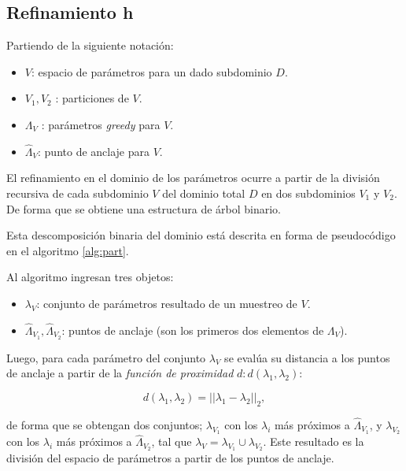 \subsection{Refinamiento h}

Partiendo de la siguiente notación:
\begin{itemize}
\item $V$: espacio de parámetros para un dado subdominio $D$.
\item $V_1, V_2$ : particiones de $V$.
\item $\Lambda_V$ : parámetros \textit{greedy} para $V$.
\item  $\hat{\Lambda}_{V}$: punto de anclaje para $V$.
\end{itemize}

El refinamiento en el dominio de los parámetros ocurre a partir de la división recursiva de cada subdominio $V$ del dominio total $D$ en dos subdominios $V_1$ y $V_2$. De forma que se obtiene una estructura de árbol binario.


Esta descomposición binaria del dominio está descrita en forma de pseudocódigo en el algoritmo \ref{alg:part}.

Al algoritmo ingresan tres objetos:

\begin{itemize}
\item $\lambda_V$: conjunto de parámetros resultado de un muestreo de $V$.
\item $\hat{\Lambda}_{V_1}, \hat{\Lambda}_{V_2}$: puntos de anclaje (son los primeros dos elementos de $\Lambda_V$).
\end{itemize}

Luego, para cada parámetro del conjunto $\lambda_V$ se evalúa su distancia a los puntos de anclaje a partir de la \textit{función de proximidad} $d: d(\lambda_1, \lambda_2)$:

\[
d(\lambda_1, \lambda_2) = ||\lambda_1 - \lambda_2||_2,
\]

de forma que se obtengan dos conjuntos; $\lambda_{V_1}$ con los $\lambda_{i}$ más próximos a $\hat{\Lambda}_{V_1}$, y $\lambda_{V_2}$ con los $\lambda_{i}$ más próximos a $\hat{\Lambda}_{V_2}$, tal que  $\lambda_{V} =\lambda_{V_1} \cup \lambda_{V_2}$. Este resultado es la división del espacio de parámetros a partir de los puntos de anclaje.

